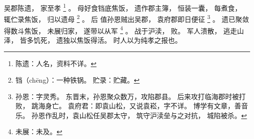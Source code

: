
\switchcolumn*[\section{}]

吴郡陈遗，
家至孝%
\footnote{%
    陈遗：人名，资料不详。
}%
。
母好食铛底焦饭，
遗作郡主簿，
恒装一囊，
每煮食，
辄伫录焦饭，
归以遗母%
\footnote{%
    铛（chēng）：一种铁锅。
    贮录：贮藏。
}%
。
后
值孙恩贼出吴郡，
袁府郡即日便征%
\footnote{%
    孙恩：字灵秀。
          东晋末，孙恩聚众数万，攻陷郡县。
          后来攻打临海郡时被打败，
          跳海身亡。
    袁府君：即袁山松，又说袁崧，字不详。
            博学有文章，善音乐。
            孙恩作乱时，袁山松任吴郡太守，
            筑守沪渎垒与之对抗，
            城陷被杀。
}%
。
遗已聚敛得数斗焦饭，
未展归家，
遂带以从军%
\footnote{%
    未展：未及。
}%
。
战于沪渎，
败。
军人溃散，
逃走山泽，
皆多饥死，
遗独以焦饭得活。
时人以为纯孝之报也。

\switchcolumn



